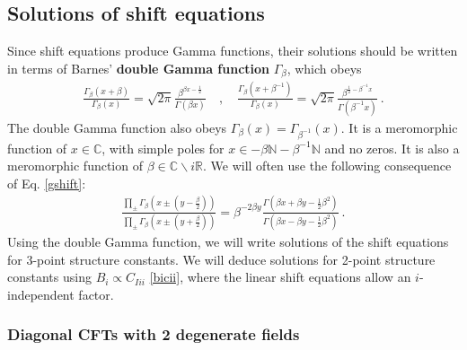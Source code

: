 \documentclass[12pt, a4paper]{article}
\newcommand{\myindex}[1]{\textbf{\boldmath #1}}
\theoremstyle{break}
\begin{document}
\subsection{Solutions of shift equations}\label{sec:essc}

Since shift equations produce Gamma functions, their solutions should be written in terms of Barnes' \myindex{double Gamma function} $\Gamma_\beta$, which obeys
\begin{align}
\frac{\Gamma_\beta(x+\beta)}{\Gamma_\beta(x)} = \sqrt{2\pi}\frac{\beta^{\beta x-\frac12}}{\Gamma(\beta x)}
\quad , \quad 
\frac{\Gamma_\beta(x+\beta^{-1})}{\Gamma_\beta(x)} = \sqrt{2\pi}\frac{\beta^{\frac12-\beta^{-1}x}}{\Gamma(\beta^{-1}x)} \ .
\label{gshift}
\end{align}
The double Gamma function also obeys $\Gamma_\beta(x)= \Gamma_{\beta^{-1}}(x)$. It is a meromorphic function of $x\in\mathbb{C}$, with simple poles for $x\in -\beta\mathbb{N}-\beta^{-1}\mathbb{N}$ and no zeros. It is also a meromorphic function of $\beta\in \mathbb{C}\backslash i\mathbb{R}$. We will often use the following consequence of Eq. \eqref{gshift}:
\begin{align}
 \frac{\prod_\pm \Gamma_\beta\left(x \pm (y-\frac{\beta}{2})\right)}{\prod_\pm \Gamma_\beta\left(x \pm (y+\frac{\beta}{2})\right)} = \beta^{-2\beta y}\frac{\Gamma\left(\beta x+\beta y - \frac12 \beta^2\right)}{\Gamma\left(\beta x-\beta y -\frac12 \beta^2\right)}\ . 
\end{align}
Using the double Gamma function, we will write solutions of the shift equations for 3-point structure constants. We will deduce solutions for 2-point structure constants using $B_i\propto C_{Iii}$ \eqref{bicii}, where the linear shift equations allow an $i$-independent factor. 

\subsubsection{Diagonal CFTs with 2 degenerate fields}
\end{document}
